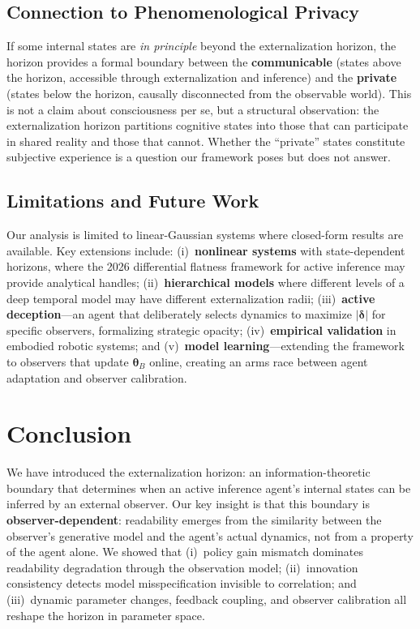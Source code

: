 \documentclass[runningheads]{llncs}
\begin{document}
\subsection{Connection to Phenomenological Privacy}

If some internal states are \emph{in principle} beyond the externalization horizon, the horizon provides a formal boundary between the \textbf{communicable} (states above the horizon, accessible through externalization and inference) and the \textbf{private} (states below the horizon, causally disconnected from the observable world). This is not a claim about consciousness per se, but a structural observation: the externalization horizon partitions cognitive states into those that can participate in shared reality and those that cannot. Whether the ``private'' states constitute subjective experience is a question our framework poses but does not answer.

\subsection{Limitations and Future Work}

Our analysis is limited to linear-Gaussian systems where closed-form results are available. Key extensions include: (i)~\textbf{nonlinear systems} with state-dependent horizons, where the 2026 differential flatness framework for active inference \cite{friston2026flatness} may provide analytical handles; (ii)~\textbf{hierarchical models} where different levels of a deep temporal model may have different externalization radii; (iii)~\textbf{active deception}---an agent that deliberately selects dynamics to maximize $|\boldsymbol{\delta}|$ for specific observers, formalizing strategic opacity; (iv)~\textbf{empirical validation} in embodied robotic systems; and (v)~\textbf{model learning}---extending the framework to observers that update $\boldsymbol{\theta}_B$ online, creating an arms race between agent adaptation and observer calibration.

\section{Conclusion}
\label{sec:conclusion}

We have introduced the externalization horizon: an information-theoretic boundary that determines when an active inference agent's internal states can be inferred by an external observer. Our key insight is that this boundary is \textbf{observer-dependent}: readability emerges from the similarity between the observer's generative model and the agent's actual dynamics, not from a property of the agent alone. We showed that (i)~policy gain mismatch dominates readability degradation through the observation model; (ii)~innovation consistency detects model misspecification invisible to correlation; and (iii)~dynamic parameter changes, feedback coupling, and observer calibration all reshape the horizon in parameter space.
\end{document}
